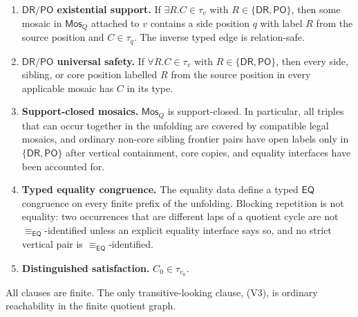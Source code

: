 \documentclass[11pt]{article}
\theoremstyle{remark}
\newcommand{\DR}{\mathsf{DR}}
\newcommand{\PO}{\mathsf{PO}}
\newcommand{\EQ}{\mathsf{EQ}}
\newcommand{\Mos}{\mathsf{Mos}}
\newcommand{\Eq}{\equiv_{\EQ}}
\begin{document}
\begin{enumerate}[label=(V\arabic*)]
\item \textbf{$\DR/\PO$ existential support.}  If $\exists R.C\in\tau_v$ with $R\in\{\DR,\PO\}$, then some mosaic in $\Mos_Q$ attached to $v$ contains a side position $q$ with label $R$ from the source position and $C\in\tau_q$.  The inverse typed edge is relation-safe.

\item \textbf{$\DR/\PO$ universal safety.}  If $\forall R.C\in\tau_v$ with $R\in\{\DR,\PO\}$, then every side, sibling, or core position labelled $R$ from the source position in every applicable mosaic has $C$ in its type.

\item \textbf{Support-closed mosaics.}  $\Mos_Q$ is support-closed.  In particular, all triples that can occur together in the unfolding are covered by compatible legal mosaics, and ordinary non-core sibling frontier pairs have open labels only in $\{\DR,\PO\}$ after vertical containment, core copies, and equality interfaces have been accounted for.

\item \textbf{Typed equality congruence.}  The equality data define a typed $\EQ$ congruence on every finite prefix of the unfolding.  Blocking repetition is not equality: two occurrences that are different laps of a quotient cycle are not $\Eq$-identified unless an explicit equality interface says so, and no strict vertical pair is $\Eq$-identified.

\item \textbf{Distinguished satisfaction.}  $C_0\in\tau_{v_0}$.
\end{enumerate}

All clauses are finite.  The only transitive-looking clause, (V3), is ordinary reachability in the finite quotient graph.
\end{document}
